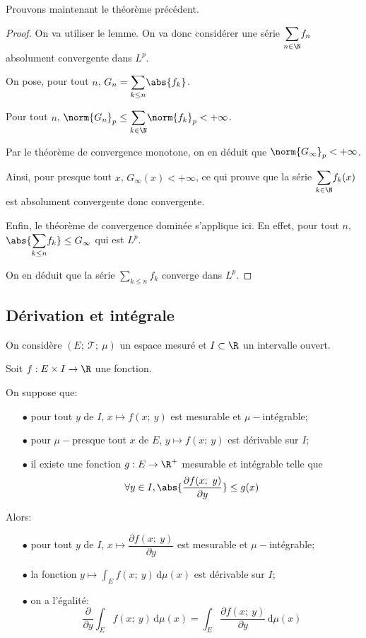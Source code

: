 Prouvons maintenant le théorème précédent.

\begin{proof}
On va utiliser le lemme. On va donc considérer une série $\displaystyle{\sum \limits_{n \in \N}} f_n$ absolument convergente dans $L^p$.

On pose, pour tout $n$, $G_n = \displaystyle{\sum \limits_{k \leq n}} \abs{f_k}$. 

Pour tout $n$, $\norm{G_n}_p \leq \displaystyle{\sum \limits_{k \in \N}} \norm{f_k}_p < +\infty$.

Par le théorème de convergence monotone, on en déduit que $\norm{G_{\infty}}_p < +\infty$. 

Ainsi, pour presque tout $x$, $G_{\infty}(x) < +\infty$, ce qui prouve que la série $\displaystyle{\sum \limits_{k \in \N}} f_k(x)$ est absolument convergente donc convergente.

Enfin, le théorème de convergence dominée s'applique ici. En effet, pour tout $n$, $\abs{\displaystyle{\sum \limits_{k \leq n}} f_k} \leq G_{\infty}$ qui est $L^p$.

On en déduit que la série $\displaystyle{\sum \limits_{k \leq n}} f_k$ converge dans $L^p$.
\end{proof}




\subsection{Dérivation et intégrale}

\begin{theo}
On considère $(E;~\mathcal{T};~\mu)$ un espace mesuré et $I \subset \R$ un intervalle ouvert.

Soit $f: E \times I \to \R$ une fonction.

On suppose que:
\begin{itemize}
\item[$\bullet$] pour tout $y$ de $I$, $x \mapsto f(x;~y)$ est mesurable et $\mu-$intégrable;
\item[$\bullet$] pour $\mu-$presque tout $x$ de $E$, $y \mapsto f(x;~y)$ est dérivable sur $I$;
\item[$\bullet$] il existe une fonction $g: E \to \R^{+}$ mesurable et intégrable telle que
\[
\forall y \in I, \abs{\dfrac{\partial f(x;~y)}{\partial y}} \leq g(x)
\]
\end{itemize}

Alors:
\begin{itemize}
\item[$\bullet$] pour tout $y$ de $I$, $x \mapsto \dfrac{\partial f(x;~y)}{\partial y}$ est mesurable et $\mu-$intégrable;
\item[$\bullet$] la fonction $y \mapsto \displaystyle{\int}_E f(x;~y) \, \mathrm d \mu(x)$ est dérivable sur $I$;
\item[$\bullet$] on a l'égalité:
\[
\dfrac{\partial}{\partial y} \displaystyle{\int}_E f(x;~y) \, \mathrm d \mu(x) = \displaystyle{\int}_E \dfrac{\partial f(x;~y)}{\partial y} \, \mathrm d \mu(x)
\]
\end{itemize}

\end{theo}

